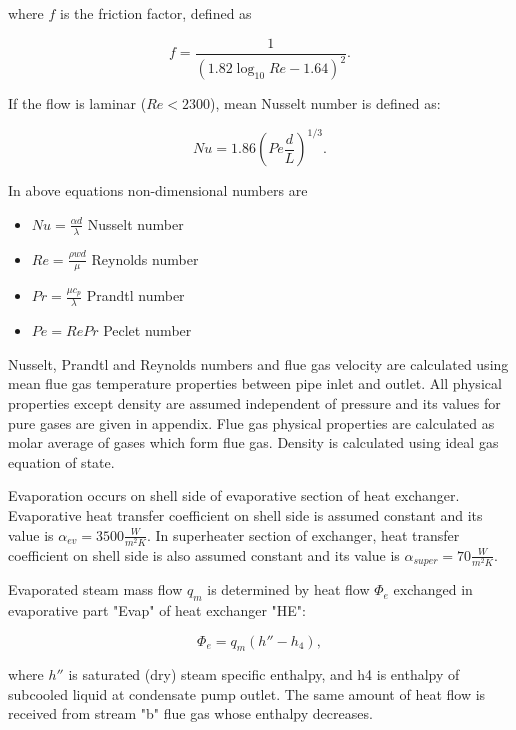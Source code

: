 \documentclass{article}
\begin{document}
	\noindent
	where $f$ is the friction factor, defined as
	
	\begin{equation}\label{eq:fric_factor}
		f = \frac{1}{(1.82\log_{10}Re - 1.64)^2}.
	\end{equation}
	
	\noindent
	If the flow is laminar ($Re<2300$), mean Nusselt number is defined as:
	
	\begin{equation}\label{eq:nusselt2}
		Nu = 1.86 \left(Pe \frac{d}{L}\right)^{1/3}.
	\end{equation}
	
	\noindent
	In above equations non-dimensional numbers are
	
	\begin{itemize}
		\item $Nu = \frac{\alpha d}{\lambda}$ Nusselt number
		\item $Re = \frac{\rho w d}{\mu}$ Reynolds number
		\item $Pr = \frac{\mu c_p}{\lambda}$ Prandtl number
		\item $Pe = Re Pr$ Peclet number
	\end{itemize}

	\noindent
	Nusselt, Prandtl and Reynolds numbers and flue gas velocity are calculated using mean flue gas temperature properties between pipe inlet and outlet. All physical properties except density are assumed independent of pressure and its values for pure gases are given in appendix. Flue gas physical properties are calculated as molar average of gases which form flue gas. Density is calculated using ideal gas equation of state.
	
	\noindent
	Evaporation occurs on shell side of evaporative section of heat exchanger. Evaporative heat transfer coefficient on shell side is assumed constant and its value is $\alpha_{ev}=3500 \frac{W}{m^2 K}$. In superheater section of exchanger, heat transfer coefficient on shell side is also assumed constant and its value is $\alpha_{super}=70 \frac{W}{m^2 K}$.
	
	Evaporated steam mass flow $q_m$ is determined by heat flow $\Phi_e$ exchanged in evaporative part "Evap" of heat exchanger "HE":
	
	\begin{equation}\label{eq:evap_steam_mass}
		\Phi_e = q_m(h'' -h_4),
	\end{equation}
	
	where $h''$ is saturated (dry) steam specific enthalpy, and h4 is enthalpy of subcooled liquid at condensate pump outlet. 
	The same amount of heat flow is received from stream "b" flue gas whose enthalpy decreases.
	
\end{document}
